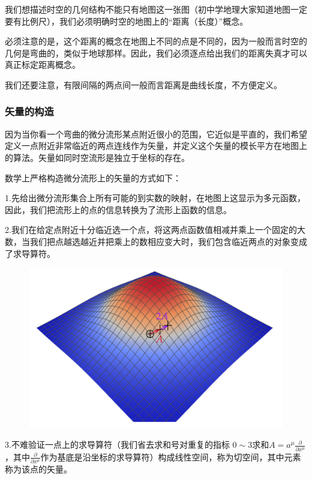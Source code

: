\documentclass{article}
\begin{document}
我们想描述时空的几何结构不能只有地图这一张图（初中学地理大家知道地图一定要有比例尺），我们必须明确时空的地图上的“距离（长度）”概念。

必须注意的是，这个距离的概念在地图上不同的点是不同的，因为一般而言时空的几何是弯曲的，类似于地球那样。因此，我们必须逐点给出我们的距离失真才可以真正标定距离概念。

我们还要注意，有限间隔的两点间一般而言距离是曲线长度，不方便定义。

\subsubsection{矢量的构造}
因为当你看一个弯曲的微分流形某点附近很小的范围，它近似是平直的，我们希望定义一点附近非常临近的两点连线作为矢量，并定义这个矢量的模长平方在地图上的算法。矢量如同时空流形是独立于坐标的存在。

数学上严格构造微分流形上的矢量的方式如下：

1.先给出微分流形集合上所有可能的到实数的映射，在地图上这显示为多元函数，因此，我们把流形上的点的信息转换为了流形上函数的信息。

2.我们在给定点附近十分临近选一个点，将这两点函数值相减并乘上一个固定的大数，当我们把点越选越近并把乘上的数相应变大时，我们包含临近两点的对象变成了求导算符。

\begin{figure}[htbp]
    \centering
    \includegraphics[scale=0.2]{3.png}
\end{figure}

3.不难验证一点上的求导算符（我们省去求和号对重复的指标 $ 0 \sim 3 $求和$A=a^\mu \frac{\partial}{\partial x^\mu }$，其中$\frac{\partial}{\partial x^\mu }$作为基底是沿坐标的求导算符）构成线性空间，称为切空间，其中元素称为该点的矢量。
\end{document}

